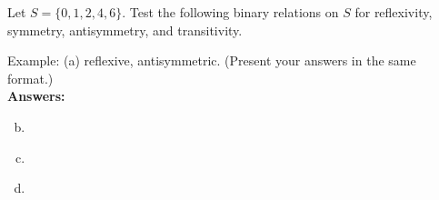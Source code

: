 \documentclass[fleqn,addpoints,12pt]{exam}
\newif\ifanswers
\theoremstyle{remark}
\begin{document}
\begin{questions}
\begin{solution}
\begin{parts}
      \part 
    \end{parts}
  \end{solution}


  \question[3]
  \label{Ex:9} %
  Let $S = \{0, 1, 2, 4, 6\}$.  Test the following binary
  relations on $S$ for reflexivity, symmetry, antisymmetry, and transitivity.
  \medskip
  Example: (a) reflexive, antisymmetric.
  (Present your answers in the same format.)\\[4pt] 
  {\bf Answers:}
    \begin{enumerate}[(a)]
      \setcounter{enumi}{1}
    \item ~\\[7pt]
    \item ~\\[7pt]
    \item ~\\[7pt]
    \end{enumerate}

  \medskip

  \begin{solution} 
  \begin{parts}

\end{parts}
\end{solution}
\end{questions}
\end{document}
